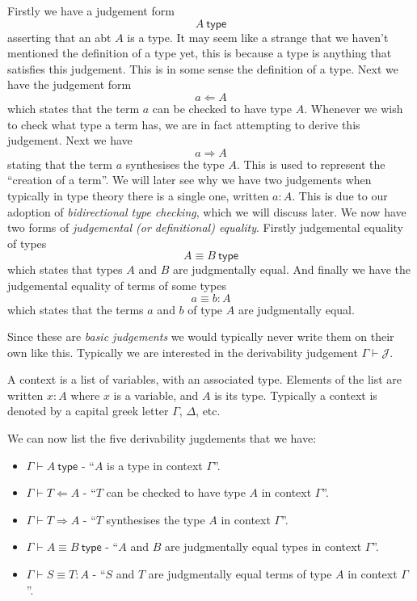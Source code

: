 \begin{defin}
    Firstly we have a judgement form 
    $$A \ \mathsf{type}$$
    asserting that an abt $A$ is a type. It may seem like a strange that we haven't mentioned the definition of a type yet, this is because a type is anything that satisfies this judgement. This is in some sense the definition of a type.
    Next we have the judgement form
    $$a \Leftarrow A$$
    which states that the term $a$ can be checked to have type $A$. Whenever we wish to check what type a term has, we are in fact attempting to derive this judgement.
    Next we have
    $$a \Rightarrow A$$
    stating that the term $a$ synthesises the type $A$. This is used to represent the ``creation of a term''. We will later see why we have two judgements when typically in type theory there is a single one, written $a : A$. This is due to our adoption of \emph{bidirectional type checking}, which we will discuss later.
    We now have two forms of \emph{judgemental (or definitional) equality}. Firstly judgemental equality of types
    $$A \equiv B \ \mathsf{type}$$
    which states that types $A$ and $B$ are judgmentally equal. And finally we have the judgemental equality of terms of some types
    $$a \equiv b : A$$
    which states that the terms $a$ and $b$ of type $A$ are judgmentally equal.
\end{defin}

\begin{remark}
    Since these are \emph{basic judgements} we would typically never write them on their own like this. Typically we are interested in the derivability judgement $\Gamma \vdash \mathcal{J}$. 
\end{remark}

\begin{defin}\label{context_def}
    A context is a list of variables, with an associated type. Elements of the list are written $x : A$ where $x$ is a variable, and $A$ is its type. Typically a context is denoted by a capital greek letter $\Gamma$, $\Delta$, etc.
\end{defin}

We can now list the five derivability jugdements that we have:

\begin{itemize}
    \item $\Gamma \vdash A\ \mathsf{type}$ - ``$A$ is a type in context $\Gamma$''.
    \item $\Gamma \vdash T \Leftarrow A$ - ``$T$ can be checked to have type $A$ in context $\Gamma$''.
    \item $\Gamma \vdash T \Rightarrow A$ - ``$T$ synthesises the type $A$ in context $\Gamma$''.
    \item $\Gamma \vdash A \equiv B\ \mathsf{type}$ - ``$A$ and $B$ are judgmentally equal types in context $\Gamma$''.
    \item $\Gamma \vdash S \equiv T : A$ - ``$S$ and $T$ are judgmentally equal terms of type $A$ in context $\Gamma$''.
\end{itemize}

